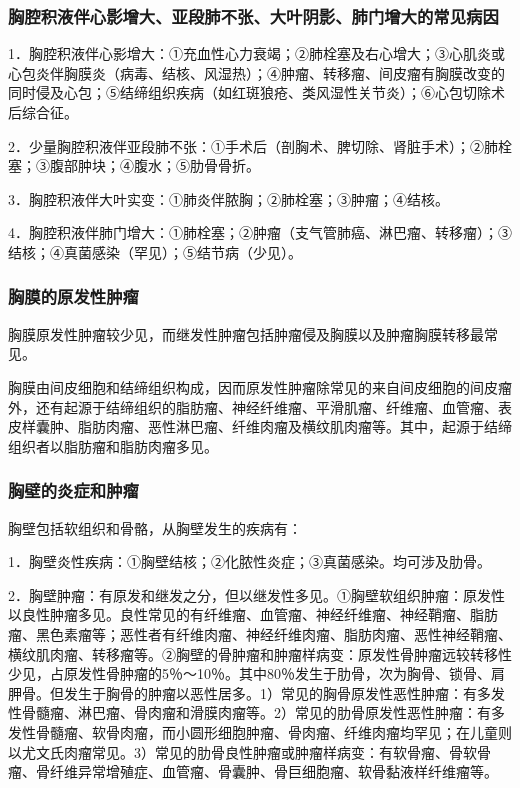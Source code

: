 \subsubsection{胸腔积液伴心影增大、亚段肺不张、大叶阴影、肺门增大的常见病因}

1．胸腔积液伴心影增大：①充血性心力衰竭；②肺栓塞及右心增大；③心肌炎或心包炎伴胸膜炎（病毒、结核、风湿热）；④肿瘤、转移瘤、间皮瘤有胸膜改变的同时侵及心包；⑤结缔组织疾病（如红斑狼疮、类风湿性关节炎）；⑥心包切除术后综合征。

2．少量胸腔积液伴亚段肺不张：①手术后（剖胸术、脾切除、肾脏手术）；②肺栓塞；③腹部肿块；④腹水；⑤肋骨骨折。

3．胸腔积液伴大叶实变：①肺炎伴脓胸；②肺栓塞；③肿瘤；④结核。

4．胸腔积液伴肺门增大：①肺栓塞；②肿瘤（支气管肺癌、淋巴瘤、转移瘤）；③结核；④真菌感染（罕见）；⑤结节病（少见）。

\subsubsection{胸膜的原发性肿瘤}

胸膜原发性肿瘤较少见，而继发性肿瘤包括肿瘤侵及胸膜以及肿瘤胸膜转移最常见。

胸膜由间皮细胞和结缔组织构成，因而原发性肿瘤除常见的来自间皮细胞的间皮瘤外，还有起源于结缔组织的脂肪瘤、神经纤维瘤、平滑肌瘤、纤维瘤、血管瘤、表皮样囊肿、脂肪肉瘤、恶性淋巴瘤、纤维肉瘤及横纹肌肉瘤等。其中，起源于结缔组织者以脂肪瘤和脂肪肉瘤多见。

\subsubsection{胸壁的炎症和肿瘤}

胸壁包括软组织和骨骼，从胸壁发生的疾病有：

1．胸壁炎性疾病：①胸壁结核；②化脓性炎症；③真菌感染。均可涉及肋骨。

2．胸壁肿瘤：有原发和继发之分，但以继发性多见。①胸壁软组织肿瘤：原发性以良性肿瘤多见。良性常见的有纤维瘤、血管瘤、神经纤维瘤、神经鞘瘤、脂肪瘤、黑色素瘤等；恶性者有纤维肉瘤、神经纤维肉瘤、脂肪肉瘤、恶性神经鞘瘤、横纹肌肉瘤、转移瘤等。②胸壁的骨肿瘤和肿瘤样病变：原发性骨肿瘤远较转移性少见，占原发性骨肿瘤的5％～10％。其中80％发生于肋骨，次为胸骨、锁骨、肩胛骨。但发生于胸骨的肿瘤以恶性居多。1）常见的胸骨原发性恶性肿瘤：有多发性骨髓瘤、淋巴瘤、骨肉瘤和滑膜肉瘤等。2）常见的肋骨原发性恶性肿瘤：有多发性骨髓瘤、软骨肉瘤，而小圆形细胞肿瘤、骨肉瘤、纤维肉瘤均罕见；在儿童则以尤文氏肉瘤常见。3）常见的肋骨良性肿瘤或肿瘤样病变：有软骨瘤、骨软骨瘤、骨纤维异常增殖症、血管瘤、骨囊肿、骨巨细胞瘤、软骨黏液样纤维瘤等。

